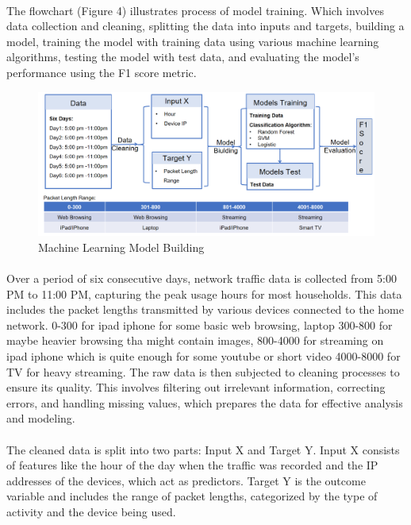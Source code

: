 \documentclass[10pt]{article}
\begin{document}
\paragraph{}
The flowchart (Figure 4) illustrates process of model training. Which involves data collection and cleaning, splitting the data into inputs and targets, building a model, training the model with training data using various machine learning algorithms, testing the model with test data, and evaluating the model's performance using the F1 score metric.
\begin{figure}[H]
    \centering
    \includegraphics[width=0.9\linewidth]{Machine Learning Model Building.png}
    \caption{Machine Learning Model Building}
    \label{fig:enter-label}
\end{figure}
\paragraph{}
Over a period of six consecutive days, network traffic data is collected from 5:00 PM to 11:00 PM, capturing the peak usage hours for most households. This data includes the packet lengths transmitted by various devices connected to the home network. 0-300 for ipad iphone for some basic web browsing,  laptop 300-800 for maybe heavier browsing tha might contain images, 800-4000 for streaming on ipad iphone which is quite enough for some youtube or short video 4000-8000 for TV for heavy streaming. The raw data is then subjected to cleaning processes to ensure its quality. This involves filtering out irrelevant information, correcting errors, and handling missing values, which prepares the data for effective analysis and modeling.

\paragraph{}
The cleaned data is split into two parts: Input X and Target Y. Input X consists of features like the hour of the day when the traffic was recorded and the IP addresses of the devices, which act as predictors. Target Y is the outcome variable and includes the range of packet lengths, categorized by the type of activity and the device being used.
\end{document}
